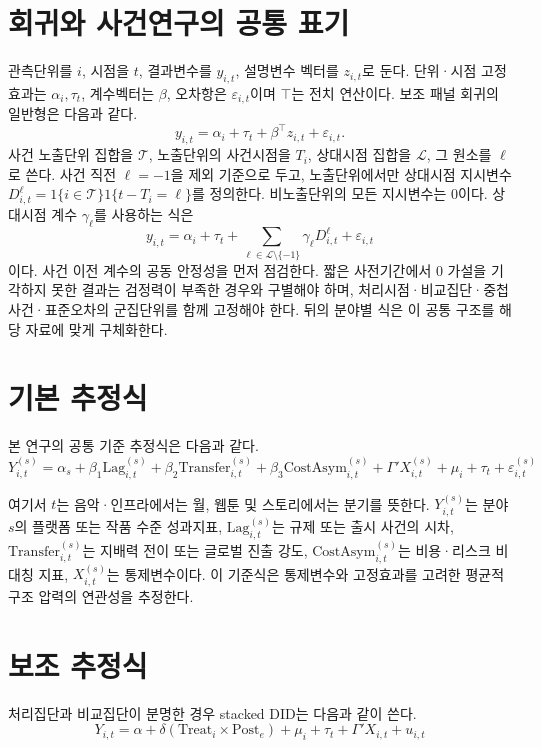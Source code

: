 \documentclass[11pt,a4paper]{report}
\begin{document}
\section{회귀와 사건연구의 공통 표기}
관측단위를 \(i\), 시점을 \(t\), 결과변수를 \(y_{i,t}\), 설명변수 벡터를 \(z_{i,t}\)로 둔다. 단위·시점 고정효과는 \(\alpha_i,\tau_t\), 계수벡터는 \(\beta\), 오차항은 \(\varepsilon_{i,t}\)이며 \(\top\)는 전치 연산이다. 보조 패널 회귀의 일반형은 다음과 같다.
\[
y_{i,t}=\alpha_i+\tau_t+\beta^\top z_{i,t}+\varepsilon_{i,t}.
\]
사건 노출단위 집합을 \(\mathcal T\), 노출단위의 사건시점을 \(T_i\), 상대시점 집합을 \(\mathcal L\), 그 원소를 \(\ell\)로 쓴다. 사건 직전 \(\ell=-1\)을 제외 기준으로 두고, 노출단위에서만 상대시점 지시변수 \(D^\ell_{i,t}=1\{i\in\mathcal T\}1\{t-T_i=\ell\}\)를 정의한다. 비노출단위의 모든 지시변수는 0이다. 상대시점 계수 \(\gamma_\ell\)를 사용하는 식은
\[
y_{i,t}=\alpha_i+\tau_t+
\sum_{\ell\in\mathcal L\setminus\{-1\}}\gamma_\ell D^\ell_{i,t}
+\varepsilon_{i,t}
\]
이다. 사건 이전 계수의 공동 안정성을 먼저 점검한다. 짧은 사전기간에서 0 가설을 기각하지 못한 결과는 검정력이 부족한 경우와 구별해야 하며, 처리시점·비교집단·중첩사건·표준오차의 군집단위를 함께 고정해야 한다. 뒤의 분야별 식은 이 공통 구조를 해당 자료에 맞게 구체화한다.

\section{기본 추정식}
본 연구의 공통 기준 추정식은 다음과 같다.
\begin{equation}
\label{eq:common_panel_fe}
Y_{i,t}^{(s)} = \alpha_s + \beta_1 \mathrm{Lag}_{i,t}^{(s)} + \beta_2 \mathrm{Transfer}_{i,t}^{(s)} + \beta_3 \mathrm{CostAsym}_{i,t}^{(s)} + \Gamma' X_{i,t}^{(s)} + \mu_i + \tau_t + \varepsilon_{i,t}^{(s)}
\end{equation}

여기서 $t$는 음악·인프라에서는 월, 웹툰 및 스토리에서는 분기를 뜻한다. $Y_{i,t}^{(s)}$는 분야 $s$의 플랫폼 또는 작품 수준 성과지표, $\mathrm{Lag}_{i,t}^{(s)}$는 규제 또는 출시 사건의 시차, $\mathrm{Transfer}_{i,t}^{(s)}$는 지배력 전이 또는 글로벌 진출 강도, $\mathrm{CostAsym}_{i,t}^{(s)}$는 비용·리스크 비대칭 지표, $X_{i,t}^{(s)}$는 통제변수이다. 이 기준식은 통제변수와 고정효과를 고려한 평균적 구조 압력의 연관성을 추정한다.

\section{보조 추정식}
처리집단과 비교집단이 분명한 경우 stacked DID는 다음과 같이 쓴다.
\begin{equation}
\label{eq:stacked_did}
Y_{i,t} = \alpha + \delta \left(\mathrm{Treat}_i \times \mathrm{Post}_e\right) + \mu_i + \tau_t + \Gamma' X_{i,t} + u_{i,t}
\end{equation}
\end{document}

